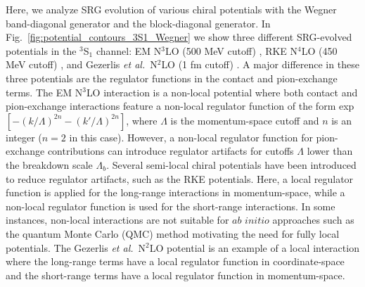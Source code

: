 \documentclass[preprintnumbers,floatfix,aps,prc,preprint,nofootinbib]{revtex4-1}
\begin{document}
%
Here, we analyze SRG evolution of various chiral potentials with the Wegner band-diagonal generator and the block-diagonal generator. In Fig.~\ref{fig:potential_contours_3S1_Wegner} we show three different SRG-evolved potentials in the $^3$S$_1$ channel: EM N$^3$LO (500 MeV cutoff) \cite{Entem:2003ft}, RKE N$^4$LO (450 MeV cutoff) \cite{Reinert:2017usi}, and Gezerlis \textit{et al.}~N$^2$LO (1 fm cutoff) \cite{Gezerlis:2014zia}. A major difference in these three potentials are the regulator functions in the contact and pion-exchange terms. The EM N$^3$LO interaction is a non-local potential where both contact and pion-exchange interactions feature a non-local regulator function of the form exp$[-(k/\Lambda)^{2n}-(k'/\Lambda)^{2n}]$, where $\Lambda$ is the momentum-space cutoff and $n$ is an integer ($n=2$ in this case). However, a non-local regulator function for pion-exchange contributions can introduce regulator artifacts for cutoffs $\Lambda$ lower than the breakdown scale $\Lambda_b$. Several semi-local chiral potentials have been introduced to reduce regulator artifacts, such as the RKE potentials. Here, a local regulator function is applied for the long-range interactions in momentum-space, while a non-local regulator function is used for the short-range interactions. In some instances, non-local interactions are not suitable for $\textit{ab initio}$ approaches such as the quantum Monte Carlo (QMC) method motivating the need for fully local potentials. The Gezerlis \textit{et al.}~N$^2$LO potential is an example of a local interaction where the long-range terms have a local regulator function in coordinate-space and the short-range terms have a local regulator function in momentum-space.
%
\end{document}
